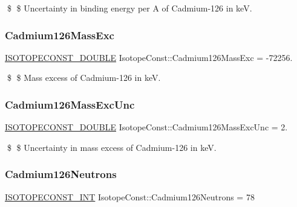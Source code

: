 \$ \$ Uncertainty in binding energy per A of Cadmium-\/126 in keV. \mbox{\label{group___isotope_const-_cadmium-_cd126_ga8ef98c033462195ab3c6aaa695237d1c}} 
\subsubsection{\texorpdfstring{Cadmium126\+Mass\+Exc}{Cadmium126MassExc}}
{\footnotesize\ttfamily \mbox{\hyperlink{group___isotope_const-_macros_ga8f45a7272ce02c0b4c65c44636ed719a}{I\+S\+O\+T\+O\+P\+E\+C\+O\+N\+S\+T\+\_\+\+D\+O\+U\+B\+LE}} Isotope\+Const\+::\+Cadmium126\+Mass\+Exc = -\/72256.}

\$ \$ Mass excess of Cadmium-\/126 in keV. \mbox{\label{group___isotope_const-_cadmium-_cd126_ga0171c8f0f24e2a3476bef9e2a32fd310}} 
\subsubsection{\texorpdfstring{Cadmium126\+Mass\+Exc\+Unc}{Cadmium126MassExcUnc}}
{\footnotesize\ttfamily \mbox{\hyperlink{group___isotope_const-_macros_ga8f45a7272ce02c0b4c65c44636ed719a}{I\+S\+O\+T\+O\+P\+E\+C\+O\+N\+S\+T\+\_\+\+D\+O\+U\+B\+LE}} Isotope\+Const\+::\+Cadmium126\+Mass\+Exc\+Unc = 2.}

\$ \$ Uncertainty in mass excess of Cadmium-\/126 in keV. \mbox{\label{group___isotope_const-_cadmium-_cd126_gacbf05a25963d264c39b6ecb0131779f0}} 
\subsubsection{\texorpdfstring{Cadmium126\+Neutrons}{Cadmium126Neutrons}}
{\footnotesize\ttfamily \mbox{\hyperlink{group___isotope_const-_macros_ga5f18360b3e99483a35c32d789e62621c}{I\+S\+O\+T\+O\+P\+E\+C\+O\+N\+S\+T\+\_\+\+I\+NT}} Isotope\+Const\+::\+Cadmium126\+Neutrons = 78}

